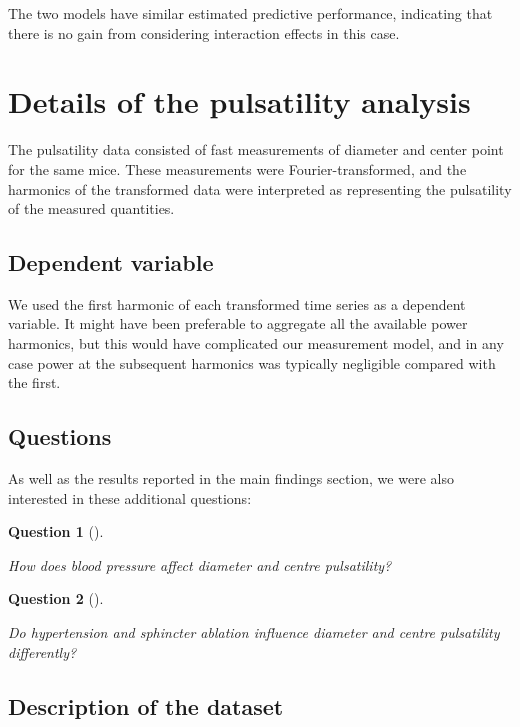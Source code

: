 \documentclass[
  letterpaper,
  DIV=11,
  numbers=noendperiod,
  oneside]{scrartcl}
\theoremstyle{plain}
\newtheorem{theorem}{Question}[section]
\theoremstyle{remark}
\begin{document}
The two models have similar estimated predictive performance, indicating
that there is no gain from considering interaction effects in this case.

\section{Details of the pulsatility
analysis}\label{details-of-the-pulsatility-analysis}

The pulsatility data consisted of fast measurements of diameter and
center point for the same mice. These measurements were
Fourier-transformed, and the harmonics of the transformed data were
interpreted as representing the pulsatility of the measured quantities.

\subsection{Dependent variable}\label{dependent-variable-1}

We used the first harmonic of each transformed time series as a
dependent variable. It might have been preferable to aggregate all the
available power harmonics, but this would have complicated our
measurement model, and in any case power at the subsequent harmonics was
typically negligible compared with the first.

\subsection{Questions}\label{questions}

As well as the results reported in the main findings section, we were
also interested in these additional questions:

\begin{theorem}[]\protect\hypertarget{thm-qc}{}\label{thm-qc}

How does blood pressure affect diameter and centre pulsatility?

\end{theorem}

\begin{theorem}[]\protect\hypertarget{thm-qd}{}\label{thm-qd}

Do hypertension and sphincter ablation influence diameter and centre
pulsatility differently?

\end{theorem}

\subsection{Description of the
dataset}\label{description-of-the-dataset}
\end{document}
